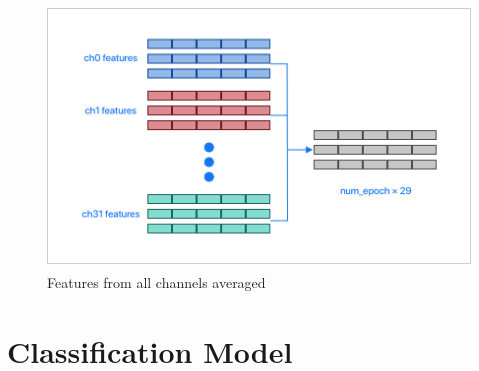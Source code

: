 \begin{figure}[H]
\centering
\includegraphics[height=7cm]{Figures/feat_channel_avg.png}
\caption{Features from all channels averaged}
\label{fig23}
\end{figure}

\section{Classification Model}

